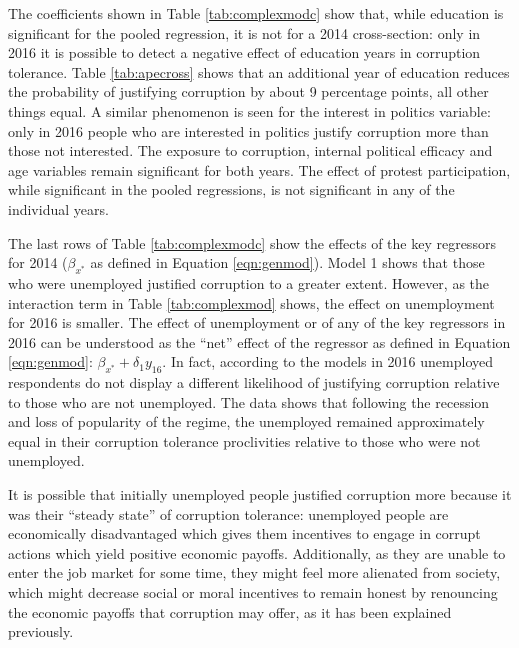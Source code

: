 \documentclass[floatsintext,man]{apa7}\usepackage[]{graphicx}\usepackage[]{color}
\begin{document}
The coefficients shown in Table \ref{tab:complexmodc} show that, while education is significant for the pooled regression, it is not for a 2014 cross-section: only in 2016 it is possible to detect a negative effect of education years in corruption tolerance. Table \ref{tab:apecross} shows that an additional year of education reduces the probability of justifying corruption by about 9 percentage points, all other things equal. A similar phenomenon is seen for the interest in politics variable: only in 2016 people who are interested in politics justify corruption more than those not interested. The exposure to corruption, internal political efficacy and age variables remain significant for both years. The effect of protest participation, while significant in the pooled regressions, is not significant in any of the individual years. 

The last rows of Table \ref{tab:complexmodc} show the effects of the key regressors for 2014 ($\beta_{x^*}$ as defined in Equation \ref{eqn:genmod}). Model 1 shows that those who were unemployed justified corruption to a greater extent. However, as the interaction term in Table \ref{tab:complexmod} shows, the effect on unemployment for 2016 is smaller. The effect of unemployment or of any of the key regressors in 2016 can be understood as the \enquote{net} effect of the regressor as defined in Equation \ref{eqn:genmod}: $\beta_{x^*} + \delta_1 y_{16}$. In fact, according to the models in 2016 unemployed respondents do not display a different likelihood of justifying corruption relative to those who are not unemployed. The data shows that following the recession and loss of popularity of the regime, the unemployed remained approximately equal in their corruption tolerance proclivities relative to those who were not unemployed. 

It is possible that initially unemployed people justified corruption more because it was their \enquote{steady state} of corruption tolerance: unemployed people are economically disadvantaged which gives them incentives to engage in corrupt actions which yield positive economic payoffs. Additionally, as they are unable to enter the job market for some time, they might feel more alienated from society, which might decrease social or moral incentives to remain honest by renouncing the economic payoffs that corruption may offer, as it has been explained previously. 
\end{document}
